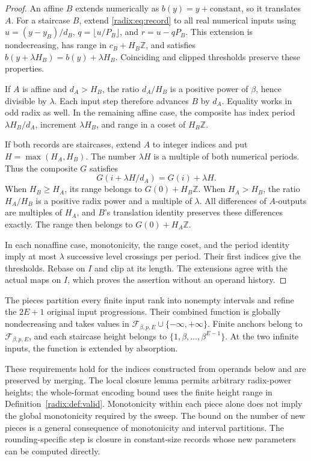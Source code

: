 \begin{proof}
An affine $B$ extends numerically as $b(y)=y+\text{constant}$, so it
translates $A$. For a staircase $B$, extend \eqref{radix:eq:record} to all
real numerical inputs using $u=(y-y_B)/d_B$, $q=\lfloor u/P_B\rfloor$,
and $r=u-qP_B$. This extension is nondecreasing, has range in
$c_B+H_B\mathbb Z$, and satisfies
$b(y+\lambda H_B)=b(y)+\lambda H_B$. Coinciding and clipped thresholds
preserve these properties.

If $A$ is affine and $d_A>H_B$, the ratio $d_A/H_B$ is a positive power
of $\beta$, hence divisible by $\lambda$. Each input step therefore
advances $B$ by $d_A$. Equality works in odd radix as well. In the
remaining affine case, the composite has index period $\lambda H_B/d_A$,
increment $\lambda H_B$, and range in a coset of $H_B\mathbb Z$.

If both records are staircases, extend $A$ to integer indices and put
$H=\max(H_A,H_B)$. The number $\lambda H$ is a multiple of both
numerical periods. Thus the composite $G$ satisfies
\[
 G(i+\lambda H/d_A)=G(i)+\lambda H.
\]
When $H_B\geq H_A$, its range belongs to $G(0)+H_B\mathbb Z$.
When $H_A>H_B$, the ratio $H_A/H_B$ is a positive radix power and a
multiple of $\lambda$. All differences of $A$-outputs are multiples of
$H_A$, and $B$'s translation identity preserves these differences
exactly. The range then belongs to $G(0)+H_A\mathbb Z$.

In each nonaffine case, monotonicity, the range coset, and the period
identity imply at most $\lambda$ successive level crossings per period.
Their first indices give the thresholds. Rebase on $I$ and clip at its
length. The extensions agree with the actual maps on $I$, which proves
the assertion without an operand history.
\end{proof}

\begin{definition}\label{radix:def:valid}
The pieces partition every finite input rank into nonempty intervals and
refine the $2E+1$ original input progressions. Their combined function is
globally nondecreasing and takes values in
$\mathcal F_{\beta,p,E}\cup\{-\infty,+\infty\}$. Finite anchors belong to
$\mathcal F_{\beta,p,E}$, and each staircase height belongs to
$\{1,\beta,\ldots,\beta^{E-1}\}$. At the two infinite inputs, the function
is extended by absorption.
\end{definition}

These requirements hold for the indices constructed from operands below
and are preserved by merging. The local closure lemma permits arbitrary
radix-power heights; the whole-format encoding bound uses the finite
height range in Definition~\ref{radix:def:valid}. Monotonicity within each
piece alone does not imply the global monotonicity required by the sweep.
The bound on the number of new pieces is a general consequence of
monotonicity and interval partitions. The rounding-specific step is closure
in constant-size records whose new parameters can be computed directly.

